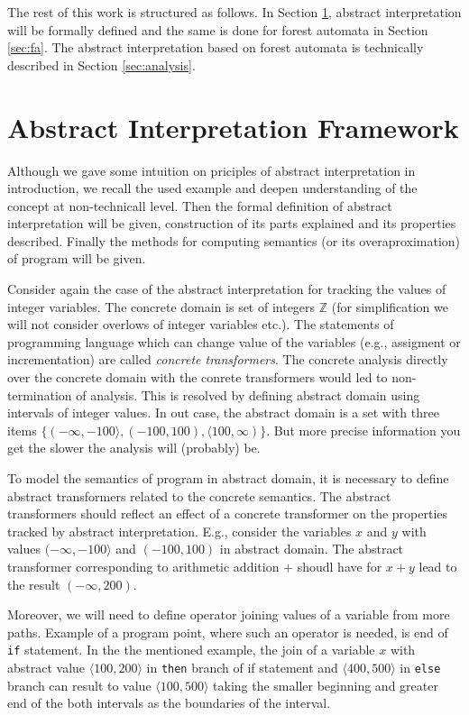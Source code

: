 \documentclass[a4paper, 12pt]{article}
\newcommand{\interval}[2]{\langle #1,#2 \rangle}
\begin{document}
The rest of this work is structured as follows.
In Section \ref{sec:aif}, abstract interpretation will
be formally defined and the same is done for forest automata
in Section \ref{sec:fa}.
The abstract interpretation based on forest automata is technically
described in Section \ref{sec:analysis}.

\section{Abstract Interpretation Framework}
\label{sec:aif}
Although we gave some intuition on priciples of abstract interpretation in introduction,
we recall the used example and deepen understanding of the concept at non-technicall level.
Then the formal definition of abstract interpretation will be given, construction of its parts
explained and its properties described.
Finally the methods for computing semantics (or its overaproximation) of program will be given.

Consider again the case of the abstract interpretation for tracking the values
of integer variables.
The concrete domain is set of integers $\mathbb{Z}$ (for simplification
we will not consider overlows of integer variables etc.).
The statements of programming language which can change value of the variables
(e.g., assigment or incrementation) are called \emph{concrete transformers}.
The concrete analysis directly over the concrete domain with the conrete transformers
would led to non-termination of analysis.
This is resolved by defining abstract domain using intervals of integer values.
In out case, the abstract domain is a set with three items $\{(-\infty,-100\rangle, (-100, 100), \langle 100,\infty)\}$.
But more precise information you get the slower the analysis will (probably) be.

To model the semantics of program in abstract domain, it is necessary to define
abstract transformers related to the concrete semantics.
The abstract transformers should reflect an effect of a concrete transformer
on the properties tracked by abstract interpretation.
E.g., consider the variables $x$ and $y$ with values $(-\infty,-100\rangle$
and $(-100, 100)$ in abstract domain.
The abstract transformer corresponding to arithmetic addition $+$
shoudl have for $x+y$ lead to the result $(-\infty,200)$.

Moreover, we will need to define operator joining values
of a variable from more paths.
Example of a program point, where such an operator is needed, is
end of \texttt{if} statement.
In the the mentioned example, the join of a variable $x$
with abstract value $\interval{100}{200}$ in \texttt{then} branch
of if statement and $\interval{400}{500}$ in \texttt{else} branch
can result to value $\interval{100}{500}$ taking the smaller beginning
and greater end of the both intervals as the boundaries of the interval.
\end{document}
